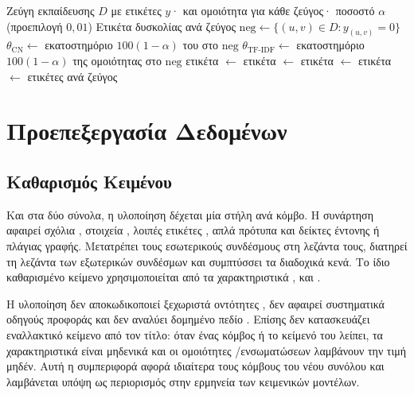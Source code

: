 \begin{algorithm}[htbp]
\caption{Πρωτόκολλο Χαρακτηρισμού Δυσκολίας}
\label{alg:difficulty}
\begin{algorithmic}[1]
\Require Ζεύγη εκπαίδευσης $D$ με ετικέτες $y$·  και ομοιότητα 
    για κάθε ζεύγος· ποσοστό $\alpha$ (προεπιλογή $0{,}01$)
\Ensure Ετικέτα δυσκολίας ανά ζεύγος
\State $\text{neg} \gets \{(u,v) \in D : y_{(u,v)} = 0\}$
\State $\theta_{\mathrm{CN}} \gets$ εκατοστημόριο $100(1-\alpha)$ του  στο $\text{neg}$
\State $\theta_{\mathrm{TF\text{-}IDF}} \gets$ εκατοστημόριο $100(1-\alpha)$ της ομοιότητας  στο $\text{neg}$
        \State ετικέτα $\gets$ 
        \State ετικέτα $\gets$ 
        \State ετικέτα $\gets$ 
    \Else
        \State ετικέτα $\gets$ 
    \EndIf
\EndFor
\State \Return ετικέτες ανά ζεύγος
\end{algorithmic}
\end{algorithm}


\section{Προεπεξεργασία Δεδομένων}
\label{sec:preprocessing}

\subsection{Καθαρισμός Κειμένου}
\label{subsec:text-cleaning}

Και στα δύο σύνολα, η υλοποίηση δέχεται μία στήλη \texttt{} ανά κόμβο.
Η συνάρτηση \texttt{} αφαιρεί σχόλια , στοιχεία
\texttt{}, λοιπές ετικέτες , απλά πρότυπα  και
δείκτες έντονης ή πλάγιας γραφής.
Μετατρέπει τους εσωτερικούς συνδέσμους στη
λεζάντα τους, διατηρεί τη λεζάντα των εξωτερικών συνδέσμων και συμπτύσσει τα
διαδοχικά κενά.
Το ίδιο καθαρισμένο κείμενο χρησιμοποιείται από τα
χαρακτηριστικά ,  και .

Η υλοποίηση δεν αποκωδικοποιεί ξεχωριστά οντότητες , δεν αφαιρεί
συστηματικά οδηγούς προφοράς και δεν αναλύει δομημένο πεδίο .
Επίσης
δεν κατασκευάζει εναλλακτικό κείμενο από τον τίτλο: όταν ένας κόμβος ή το κείμενό
του λείπει, τα χαρακτηριστικά  είναι μηδενικά και οι ομοιότητες
/ενσωματώσεων λαμβάνουν την τιμή μηδέν.
Αυτή η συμπεριφορά αφορά
ιδιαίτερα τους \WfTextEmptyN{} κόμβους του νέου συνόλου και λαμβάνεται υπόψη ως
περιορισμός στην ερμηνεία των κειμενικών μοντέλων.

